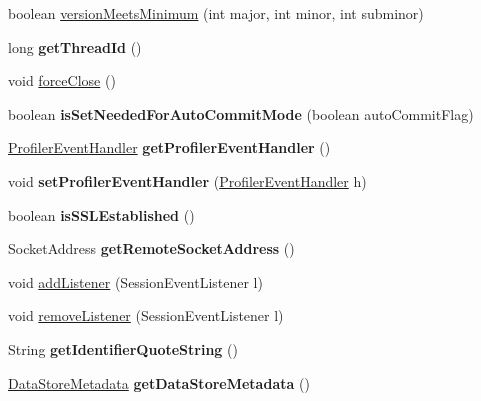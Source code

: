 \begin{DoxyCompactItemize}
\item 
boolean \mbox{\hyperlink{classcom_1_1mysql_1_1cj_1_1_core_session_ac8cdb7493dd85ef25abc436061e704eb}{version\+Meets\+Minimum}} (int major, int minor, int subminor)
\item 
\mbox{\label{classcom_1_1mysql_1_1cj_1_1_core_session_ae141e5eacf82d93db417cb2e97acfece}} 
long {\bfseries get\+Thread\+Id} ()
\item 
void \mbox{\hyperlink{classcom_1_1mysql_1_1cj_1_1_core_session_a9a0da3cad1f23cae2481b9e8788e4bff}{force\+Close}} ()
\item 
\mbox{\label{classcom_1_1mysql_1_1cj_1_1_core_session_a126e95932ffb8fdf73b7c4ae4d43972b}} 
boolean {\bfseries is\+Set\+Needed\+For\+Auto\+Commit\+Mode} (boolean auto\+Commit\+Flag)
\item 
\mbox{\label{classcom_1_1mysql_1_1cj_1_1_core_session_ada22cc07db1eb2fb753966f8b0e74183}} 
\mbox{\hyperlink{interfacecom_1_1mysql_1_1cj_1_1log_1_1_profiler_event_handler}{Profiler\+Event\+Handler}} {\bfseries get\+Profiler\+Event\+Handler} ()
\item 
\mbox{\label{classcom_1_1mysql_1_1cj_1_1_core_session_aaeca771625df6bef13ffa37281b39bad}} 
void {\bfseries set\+Profiler\+Event\+Handler} (\mbox{\hyperlink{interfacecom_1_1mysql_1_1cj_1_1log_1_1_profiler_event_handler}{Profiler\+Event\+Handler}} h)
\item 
\mbox{\label{classcom_1_1mysql_1_1cj_1_1_core_session_ae1223b9bea2fae5aa55cc356aab2c079}} 
boolean {\bfseries is\+S\+S\+L\+Established} ()
\item 
\mbox{\label{classcom_1_1mysql_1_1cj_1_1_core_session_aeab5194dc712d997482f989571df4ab2}} 
Socket\+Address {\bfseries get\+Remote\+Socket\+Address} ()
\item 
void \mbox{\hyperlink{classcom_1_1mysql_1_1cj_1_1_core_session_a902a4736229fd40f8133480966ebcf3b}{add\+Listener}} (Session\+Event\+Listener l)
\item 
void \mbox{\hyperlink{classcom_1_1mysql_1_1cj_1_1_core_session_a28bc7a6e10e2af13fce4219b7d5557e3}{remove\+Listener}} (Session\+Event\+Listener l)
\item 
\mbox{\label{classcom_1_1mysql_1_1cj_1_1_core_session_aaefdfad2df641e33d77e2b53f855afbd}} 
String {\bfseries get\+Identifier\+Quote\+String} ()
\item 
\mbox{\label{classcom_1_1mysql_1_1cj_1_1_core_session_a470a60dea06a09fe2c519aa4ca88faf4}} 
\mbox{\hyperlink{interfacecom_1_1mysql_1_1cj_1_1_data_store_metadata}{Data\+Store\+Metadata}} {\bfseries get\+Data\+Store\+Metadata} ()
\end{DoxyCompactItemize}
